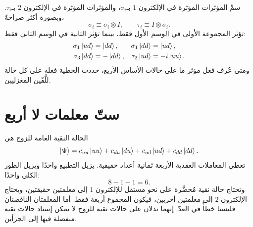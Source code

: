 سمِّ المؤثرات المؤثرة في الإلكترون \(1\) بـ\(\sigma_i\)، والمؤثرات المؤثرة في الإلكترون \(2\) بـ\(\tau_i\). وبصورة أكثر صراحةً،
\begin{equation}
  \sigma_i\equiv\sigma_i\otimes I,
  \qquad
  \tau_i\equiv I\otimes\sigma_i.
\end{equation}
تؤثر المجموعة الأولى في الوسم الأول فقط، بينما تؤثر الثانية في الوسم الثاني فقط:
\begin{align}
  \sigma_1\left\lvert ud\right\rangle&=\left\lvert dd\right\rangle,
  &
  \sigma_1\left\lvert dd\right\rangle&=\left\lvert ud\right\rangle,
  \notag\\
  \sigma_3\left\lvert dd\right\rangle&=-\left\lvert dd\right\rangle,
  &
  \tau_2\left\lvert ud\right\rangle&=-i\left\lvert uu\right\rangle.
  \label{eq:l04-local-operator-examples}
\end{align}
ومتى عُرف فعل مؤثر ما على حالات الأساس الأربع، حددت الخطية فعله على كل حالة للَّفّين المغزليين.

\begin{classroomqa}
\end{classroomqa}

\begin{classroomqa}
\end{classroomqa}

\section{ستّ معلمات لا أربع}

الحالة النقية العامة للزوج هي
\begin{equation}
  \left\lvert\Psi\right\rangle
  =
  c_{uu}\left\lvert uu\right\rangle
  +c_{du}\left\lvert du\right\rangle
  +c_{ud}\left\lvert ud\right\rangle
  +c_{dd}\left\lvert dd\right\rangle.
  \label{eq:l04-general-two-spin-state}
\end{equation}
تعطي المعاملات العقدية الأربعة ثمانية أعداد حقيقية. يزيل التطبيع واحدًا ويزيل الطور الكلي واحدًا:
\begin{equation}
  8-1-1=6.
  \label{eq:l04-two-spin-parameter-count}
\end{equation}
وتحتاج حالة نقية مُحضَّرة على نحو مستقل للإلكترون \(1\) إلى معلمتين حقيقتين، ويحتاج الإلكترون \(2\) إلى معلمتين أخريين، فيكون المجموع أربعة فقط. أما المعلمتان الناقصتان فليستا خطأً في العدّ. إنهما تدلان على حالات نقية للزوج لا يمكن إسناد حالات نقية منفصلة فيها إلى الجزأين.

